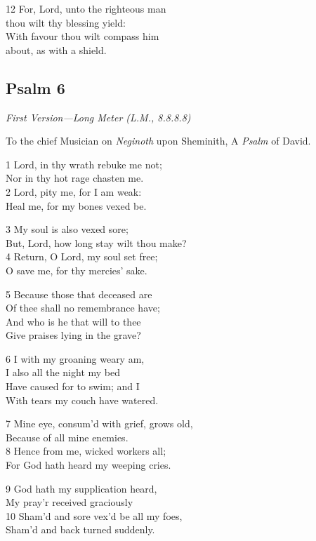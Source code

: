 \begin{multicols}{3}
12 For, Lord, unto the righteous man\\
thou wilt thy blessing yield:\\
With favour thou wilt compass him \\
about, as with a shield.

\begin{center}
\quad{}\quad{}
\end{center}

\subsection*{Psalm 6}

\emph{First Version---Long Meter (L.M., 8.8.8.8)} 

To the chief Musician on \emph{Neginoth} upon Sheminith,
A \emph{Psalm} of David.

1 Lord, in thy wrath rebuke me not;\\
Nor in thy hot rage chasten me.\\
2 Lord, pity me, for I am weak:\\
Heal me, for my bones vexed be.

3 My soul is also vexed sore;\\
But, Lord, how long stay wilt thou make?\\
4 Return, O Lord, my soul set free;\\
O save me, for thy mercies’ sake.

5 Because those that deceased are\\
Of thee shall no remembrance have;\\
And who is he that will to thee\\
Give praises lying in the grave?

6 I with my groaning weary am,\\
I also all the night my bed\\
Have caused for to swim; and I\\
With tears my couch have watered.

7 Mine eye, consum’d with grief, grows old,\\
Because of all mine enemies.\\
8 Hence from me, wicked workers all;\\
For God hath heard my weeping cries.

9 God hath my supplication heard,\\
My pray’r received graciously\\
10 Sham’d and sore vex’d be all my foes,\\
Sham’d and back turned suddenly.


\end{multicols}
